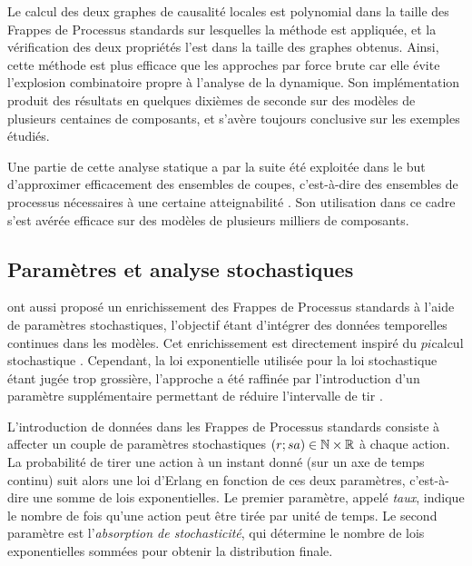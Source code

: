 Le calcul des deux graphes de causalité locales est polynomial dans la taille
des Frappes de Processus standards sur lesquelles la méthode est appliquée,
et la vérification des deux propriétés l'est dans la taille des graphes obtenus.
Ainsi, cette méthode est plus efficace que les approches par force brute
car elle évite l'explosion combinatoire propre à l'analyse de la dynamique.
Son implémentation produit des résultats en quelques dixièmes de seconde sur des modèles
de plusieurs centaines de composants, et s'avère toujours conclusive sur les exemples étudiés.

Une partie de cette analyse statique a par la suite été
exploitée dans le but d'approximer efficacement des ensembles de coupes,
c'est-à-dire des ensembles de processus nécessaires à une certaine atteignabilité
\cite{PAK13-CAV}.
Son utilisation dans ce cadre s'est avérée efficace sur des modèles de plusieurs milliers
de composants.



\subsection{Paramètres et analyse stochastiques}

\cite{PMR10-TCSB} ont aussi proposé un enrichissement des Frappes de Processus standards
à l'aide de paramètres stochastiques,
l'objectif étant d'intégrer des données temporelles continues dans les modèles.
Cet enrichissement est directement inspiré du $pi$\nbd calcul stochastique
\cite{Priami95}.
Cependant, la loi exponentielle utilisée pour la loi stochastique étant jugée trop grossière,
l'approche a été raffinée par l'introduction d'un paramètre supplémentaire permettant
de réduire l'intervalle de tir \cite{PMR10-TSE}.

\myskip

L'introduction de données dans les Frappes de Processus standards
consiste à affecter un couple de paramètres stochastiques $\mathopen{(}r\mathclose{};sa\mathclose{)} \in \mathbb{N} \times \mathbb{R}$
à chaque action.
La probabilité de tirer une action à un instant donné (sur un axe de temps continu)
suit alors une loi d'Erlang en fonction de ces deux paramètres,
c'est-à-dire une somme de lois exponentielles.
Le premier paramètre, appelé \emph{taux}, indique le nombre de fois qu'une action
peut être tirée par unité de temps.
Le second paramètre est l'\emph{absorption de stochasticité},
qui détermine le nombre de lois exponentielles sommées pour obtenir la distribution finale.

